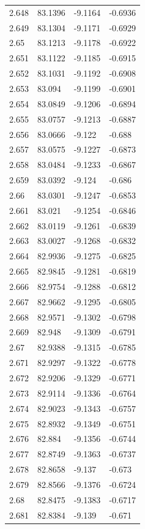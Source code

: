 \begin{tabular}{llll}
2.648 & 83.1396 & -9.1164 & -0.6936 \\
2.649 & 83.1304 & -9.1171 & -0.6929 \\
2.65 & 83.1213 & -9.1178 & -0.6922 \\
2.651 & 83.1122 & -9.1185 & -0.6915 \\
2.652 & 83.1031 & -9.1192 & -0.6908 \\
2.653 & 83.094 & -9.1199 & -0.6901 \\
2.654 & 83.0849 & -9.1206 & -0.6894 \\
2.655 & 83.0757 & -9.1213 & -0.6887 \\
2.656 & 83.0666 & -9.122 & -0.688 \\
2.657 & 83.0575 & -9.1227 & -0.6873 \\
2.658 & 83.0484 & -9.1233 & -0.6867 \\
2.659 & 83.0392 & -9.124 & -0.686 \\
2.66 & 83.0301 & -9.1247 & -0.6853 \\
2.661 & 83.021 & -9.1254 & -0.6846 \\
2.662 & 83.0119 & -9.1261 & -0.6839 \\
2.663 & 83.0027 & -9.1268 & -0.6832 \\
2.664 & 82.9936 & -9.1275 & -0.6825 \\
2.665 & 82.9845 & -9.1281 & -0.6819 \\
2.666 & 82.9754 & -9.1288 & -0.6812 \\
2.667 & 82.9662 & -9.1295 & -0.6805 \\
2.668 & 82.9571 & -9.1302 & -0.6798 \\
2.669 & 82.948 & -9.1309 & -0.6791 \\
2.67 & 82.9388 & -9.1315 & -0.6785 \\
2.671 & 82.9297 & -9.1322 & -0.6778 \\
2.672 & 82.9206 & -9.1329 & -0.6771 \\
2.673 & 82.9114 & -9.1336 & -0.6764 \\
2.674 & 82.9023 & -9.1343 & -0.6757 \\
2.675 & 82.8932 & -9.1349 & -0.6751 \\
2.676 & 82.884 & -9.1356 & -0.6744 \\
2.677 & 82.8749 & -9.1363 & -0.6737 \\
2.678 & 82.8658 & -9.137 & -0.673 \\
2.679 & 82.8566 & -9.1376 & -0.6724 \\
2.68 & 82.8475 & -9.1383 & -0.6717 \\
2.681 & 82.8384 & -9.139 & -0.671 \\

\end{tabular}
